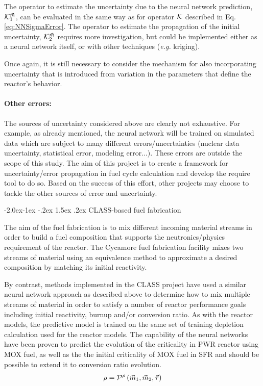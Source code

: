 \documentclass[dvips,11pt]{article}
\makeatletter
\renewcommand\subsubsection{\@startsection{subsubsection}{3}{\z@}%
                                     {-2.0ex\@plus -1ex \@minus -.2ex}%
                                     {1.5ex \@plus .2ex}%
                                     {\normalfont\bfseries}}%
\makeatother
\begin{document}
The operator to estimate the uncertainty due to
the neural network prediction, ${\cal
  K}_1^{{\vec{m}}}$, can be evaluated in the same way
as for operator ${\cal K}$ described in
Eq.\eqref{eq:NNSigmaError}. The operator to estimate
the propagation of the initial uncertainty,
${\cal K}_2^{{\vec{m}}}$ requires more investigation,
but could be implemented either as a neural
network itself, or with other techniques
(\textit{e.g.} kriging).

Once again, it is still necessary to consider the
mechanism for also incorporating uncertainty that
is introduced from variation in the parameters
that define the reactor's behavior.

\paragraph{Other errors:\\}

The sources of uncertainty considered above are
clearly not exhaustive. For example, as already
mentioned, the neural network will be trained on
simulated data which are subject to many different
errors/uncertainties (nuclear data uncertainty,
statistical error, modeling error...).  These
errors are outside the scope of this study.  The
aim of this project is to create a framework for
uncertainty/error propagation in fuel cycle
calculation and develop the require tool to do so.
Based on the success of this effort, other
projects may choose to tackle the other sources of
error and uncertainty.

\subsubsection{CLASS-based fuel fabrication} \label{sec:fabrication}

The aim of the fuel fabrication is to mix
different incoming material streams in order to
build a fuel composition that supports the
neutronics/physics requirement of the reactor. The
Cycamore fuel fabrication facility mixes two
streams of material using an equivalence method to
approximate a desired composition by matching its
initial reactivity.\cite{cycamore_fab}

By contrast, methods implemented in the CLASS
project have used a similar neural network
approach as described above to determine how to
mix multiple streams of material in order to
satisfy a number of reactor performance goals
including initial reactivity, burnup and/or
conversion ratio. As with the reactor models, the
predictive model is trained on the same set of
training depletion calculation used for the
reactor models. The capability of the neural
networks have been proven to predict the evolution
of the criticality in PWR reactor using MOX 
fuel\cite{Leniau.ANE.2015}, as well as
the the initial criticality of MOX fuel in 
SFR\cite{CLASS_UserGuide} and should be possible to
extend it to conversion ratio evolution.
\begin{align}
  \rho = {\cal P}^{\rho}\left( \vec{m}_{1},\vec{m}_{2}, \vec{\tau} \right)
\end{align}
\end{document}
